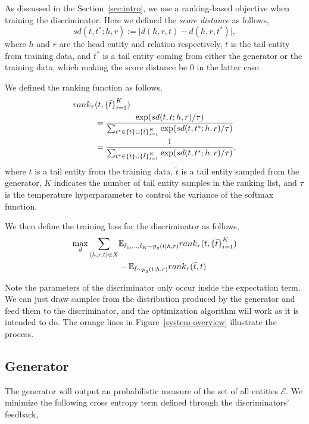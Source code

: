 \documentclass[twocolumn,a4paper,preprint,10pt,3p]{elsarticle}
\begin{document}
As discussed in the Section~\ref{sec:intro}, we use a ranking-based objective when training the discriminator. Here we defined the \emph{score distance} as follows,
\[
    sd(t, t^*; h, r) := \lvert d(h, r, t) - d(h, r, t^*) \rvert,
\]
where $h$ and $r$ are the head entity and relation respectively, $t$ is the tail entity from training data, and $t^*$ is a tail entity coming from either the generator or the training data, which making the score distance be 0 in the latter case.

We defined the ranking function as follows,
\begin{align}
    rank_\tau &(t, {\{\tilde t \}}_{i=1}^K) \notag \\
    &= \frac{\exp(sd(t, t; h, r) / \tau)}
        {\sum_{t^*\in \{t\} \cup {\{\tilde t \}}_{i=1}^K } \exp (sd(t, t^*; h, r) / \tau) } \notag \\
    &= \frac{1}
        {\sum_{t^*\in \{t\} \cup {\{\tilde t \}}_{i=1}^K } \exp (sd(t, t^*; h, r) / \tau) }, \label{eq:ranking}
\end{align}
where $t$ is a tail entity from the training data, $\tilde t$ is a tail entity sampled from the generator, $K$ indicates the number of tail entity samples in the ranking list, and $\tau$ is the temperature hyperparameter to control the variance of the softmax function.

We then define the training loss for the discriminator as follows,
\begin{align}
    \max_d \sum_{(h, r, t)\in X}
        &\mathbb{E}_{\tilde t_1, \dots, \tilde t_K \sim p_g(t \mid h, r)}
            rank_\tau(t, {\{\tilde t \}}_{i=1}^K) \notag \\
        &- \mathbb{E}_{\tilde t \sim p_g(t \mid h, r)}
            rank_\tau(\tilde t, t) \label{eq:d_loss}
\end{align}


Note the parameters of the discriminator only occur inside the expectation term. We can just draw samples from the distribution produced by the generator and feed them to the discriminator, and the optimization algorithm will work as it is intended to do. The orange lines in Figure~\ref{system-overview} illustrate the process.

\subsection{Generator}

The generator will output an probabilistic measure of the set of all entities $\mathcal{E}$. We minimize the following cross entropy term defined through the discriminators' feedback,
\end{document}
